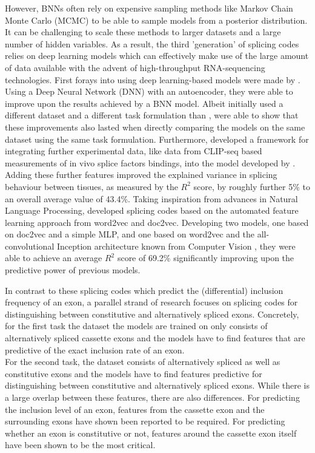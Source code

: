 However, BNNs often rely on expensive sampling methods like Markov Chain Monte Carlo (MCMC) to be able to sample models from a posterior distribution. It can be challenging to scale these methods to larger datasets and a large number of hidden variables.
As a result, the third 'generation' of splicing codes relies on deep learning models which can effectively make use of the large amount of data available with the advent of high-throughput RNA-sequencing technologies. First forays into using deep learning-based models were made by \cite{leung2014}. Using a Deep Neural Network (DNN) with an autoencoder, they were able to improve upon the results achieved by a BNN model. Albeit \cite{leung2014} initially used a different dataset and a different task formulation than \cite{bnnsplicing}, \cite{jha} were able to show that these improvements also lasted when directly comparing the models on the same dataset using the same task formulation. Furthermore, \cite{jha} developed a framework for integrating further experimental data, like data from CLIP-seq based measurements of in vivo splice factors bindings, into the model developed by \cite{leung2014}. Adding these further features improved the explained variance in splicing behaviour between tissues, as measured by the $R^2$ score, by roughly further 5\% to an overall average value of 43.4\%.
Taking inspiration from advances in Natural Language Processing, \cite{d2vsplicing} developed splicing codes based on the automated feature learning approach from word2vec and doc2vec. Developing two models, one based on doc2vec and a simple MLP, and one based on word2vec and the all-convolutional Inception architecture known from Computer Vision \cite{inception}, they were able to achieve an average $R^2$ score of 69.2\% significantly improving upon the predictive power of previous models.


In contrast to these splicing codes which predict the (differential) inclusion frequency of an exon, a parallel strand of research focuses on splicing codes for distinguishing between constitutive and alternatively spliced exons. Concretely, for the first task the dataset the models are trained on only consists of alternatively spliced cassette exons and the models have to find features that are predictive of the exact inclusion rate of an exon.\\
For the second task, the dataset consists of alternatively spliced as well as constitutive exons and the models have to find features predictive for distinguishing between constitutive and alternatively spliced exons.
While there is a large overlap between these features, there are also differences.
For predicting the inclusion level of an exon, features from the cassette exon and the surrounding exons have shown been reported to be required. \cite{splicingcodegood1} For predicting whether an exon is constitutive or not, features around the cassette exon itself have been shown to be the most critical. \cite{featurearoundexonjunc}\\

